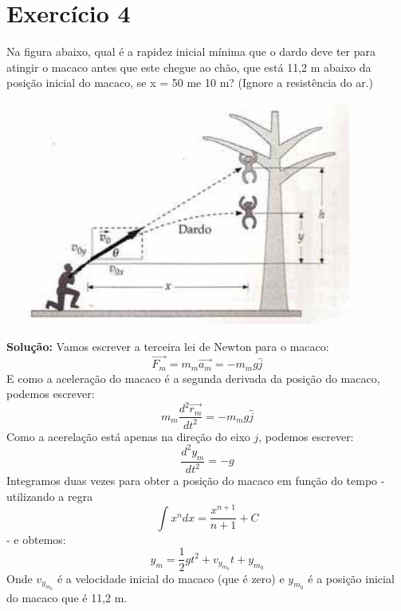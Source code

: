 \documentclass[12pt, a4paper]{article} %
\begin{document}
\section{Exerc\'icio 4}
    Na figura abaixo, qual \'e a rapidez inicial m\'inima que o dardo deve ter para atingir o macaco antes que este chegue ao ch\~ao, que est\'a 11,2 m abaixo da posi\c{c}\~ao inicial do macaco, se x = 50 me 10 m? (Ignore a resistência do ar.)

    \begin{center}
        \includegraphics[scale=0.5]{imagens/ex4.png}
    \end{center}
    \textbf{Solu\c{c}\~ao:}
    Vamos escrever a terceira lei de Newton para o macaco:
    \begin{equation}
        \overrightarrow{F_{m}} = m_{m}\overrightarrow{a_{m}} = -m_{m}g\hat{j}
    \end{equation}
    E como a acelera\c{c}\~ao do macaco \'e a segunda derivada da posi\c{c}\~ao do macaco, podemos escrever:
    \begin{equation}
        m_{m}\frac{d^{2}\overrightarrow{r_{m}}}{dt^{2}} = -m_{m}g\hat{j}
    \end{equation}
    Como a acerela\c{c}\~ao est\'a apenas na dire\c{c}\~ao do eixo $j$, podemos escrever:
    \begin{equation}
        \frac{d^{2}y_{m}}{dt^{2}} = -g
    \end{equation}
    Integramos duas vezes para obter a posi\c{c}\~ao do macaco em fun\c{c}\~ao do tempo - utilizando a regra $$\int x^{n}dx = \frac{x^{n+1}}{n+1} + C$$ - e obtemos:
    \begin{equation}
        y_{m} = \frac{1}{2}gt^{2} + v_{y_{m_{0}}}t + y_{m_{0}}
    \end{equation}
    Onde $v_{y_{m_{0}}}$ \'e a velocidade inicial do macaco (que \'e zero) e $y_{m_{0}}$ \'e a posi\c{c}\~ao inicial do macaco que \'e 11,2 m.
\end{document}

